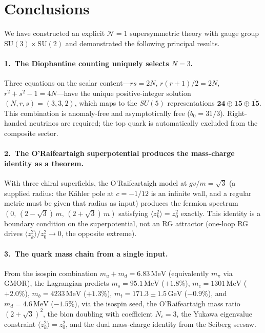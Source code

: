 \documentclass[12pt,a4paper]{article}
\newcommand{\MeV}{\,\text{MeV}}
\newcommand{\GeV}{\,\text{GeV}}
\begin{document}
\section{Conclusions}
\label{sec:conclusions}

We have constructed an explicit $\mathcal{N}=1$ supersymmetric theory
with gauge group $\mathrm{SU}(3) \times \mathrm{SU}(2)$ and demonstrated
the following principal results.

\paragraph{1.\ The Diophantine counting uniquely selects $N=3$.}
Three equations on the scalar content---$rs = 2N$, $r(r+1)/2 = 2N$,
$r^2+s^2-1 = 4N$---have the unique positive-integer solution
$(N,r,s) = (3,3,2)$, which maps to the $SU(5)$ representations
$\mathbf{24} \oplus \mathbf{15} \oplus \overline{\mathbf{15}}$.
This combination is anomaly-free and asymptotically free ($b_0 = 31/3$).
Right-handed neutrinos are required; the top quark is automatically
excluded from the composite sector.

\paragraph{2.\ The O'Raifeartaigh superpotential produces the
mass-charge identity as a theorem.}
With three chiral superfields, the O'Raifeartaigh model at
$gv/m = \sqrt{3}$ (a supplied radius: the K\"ahler pole at $c = -1/12$
is an infinite wall, and a regular metric must be given that radius as input)
produces the fermion spectrum
$(0,\, (2{-}\sqrt{3})\,m,\, (2{+}\sqrt{3})\,m)$
satisfying $\langle z_k^2\rangle = z_0^2$ exactly. This identity is a
boundary condition on the superpotential, not an RG attractor
(one-loop RG drives $\langle z_k^2\rangle/z_0^2 \to 0$,
the opposite extreme).

\paragraph{3.\ The quark mass chain from a single input.}
From the isospin combination $m_u + m_d = 6.83\MeV$
(equivalently $m_\pi$ via GMOR), the Lagrangian predicts
$m_s = 95.1\MeV$ ($+1.8\%$),
$m_c = 1301\MeV$ ($+2.0\%$), $m_b = 4233\MeV$ ($+1.3\%$),
$m_t = 171.3 \pm 1.5\GeV$ ($-0.9\%$), and $m_d = 4.6\MeV$ ($-1.5\%$),
via the isospin seed, the O'Raifeartaigh mass ratio $(2{+}\sqrt{3})^2$,
the bion doubling with coefficient $N_c = 3$, the Yukawa eigenvalue
constraint $\langle z_k^2\rangle = z_0^2$, and the dual mass-charge identity
from the Seiberg seesaw.
\end{document}

